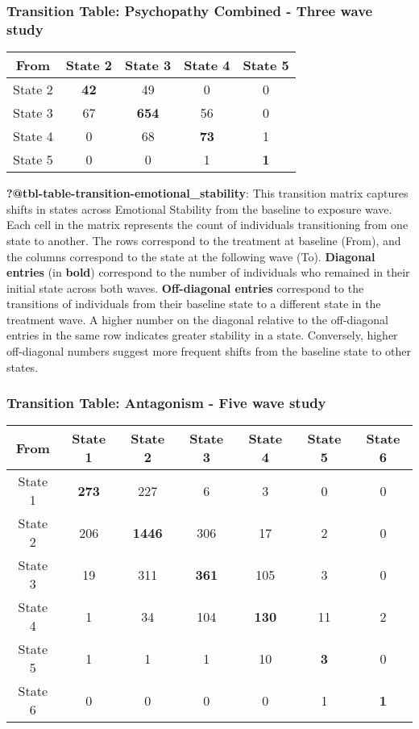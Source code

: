 \documentclass[
  singlecolumn]{article}
\begin{document}
\subsubsection{Transition Table: Psychopathy Combined - Three wave
study}\label{transition-table-psychopathy-combined---three-wave-study}

\begin{longtable}[]{@{}ccccc@{}}
\toprule\noalign{}
From & State 2 & State 3 & State 4 & State 5 \\
\midrule\noalign{}
\endhead
\bottomrule\noalign{}
\endlastfoot
State 2 & \textbf{42} & 49 & 0 & 0 \\
State 3 & 67 & \textbf{654} & 56 & 0 \\
State 4 & 0 & 68 & \textbf{73} & 1 \\
State 5 & 0 & 0 & 1 & \textbf{1} \\
\end{longtable}

\textbf{?@tbl-table-transition-emotional\_stability}: This transition
matrix captures shifts in states across Emotional Stability from the
baseline to exposure wave. Each cell in the matrix represents the count
of individuals transitioning from one state to another. The rows
correspond to the treatment at baseline (From), and the columns
correspond to the state at the following wave (To). \textbf{Diagonal
entries} (in \textbf{bold}) correspond to the number of individuals who
remained in their initial state across both waves. \textbf{Off-diagonal
entries} correspond to the transitions of individuals from their
baseline state to a different state in the treatment wave. A higher
number on the diagonal relative to the off-diagonal entries in the same
row indicates greater stability in a state. Conversely, higher
off-diagonal numbers suggest more frequent shifts from the baseline
state to other states.

\subsubsection{Transition Table: Antagonism - Five wave
study}\label{transition-table-antagonism---five-wave-study}

\begin{longtable}[]{@{}ccccccc@{}}
\toprule\noalign{}
From & State 1 & State 2 & State 3 & State 4 & State 5 & State 6 \\
\midrule\noalign{}
\endhead
\bottomrule\noalign{}
\endlastfoot
State 1 & \textbf{273} & 227 & 6 & 3 & 0 & 0 \\
State 2 & 206 & \textbf{1446} & 306 & 17 & 2 & 0 \\
State 3 & 19 & 311 & \textbf{361} & 105 & 3 & 0 \\
State 4 & 1 & 34 & 104 & \textbf{130} & 11 & 2 \\
State 5 & 1 & 1 & 1 & 10 & \textbf{3} & 0 \\
State 6 & 0 & 0 & 0 & 0 & 1 & \textbf{1} \\
\end{longtable}
\end{document}
